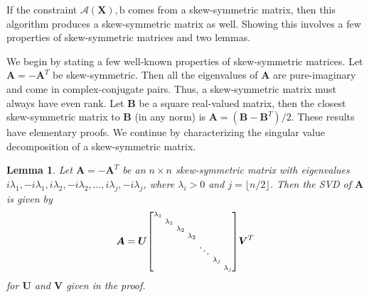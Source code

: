 \documentclass{sig-alternate}
\newtheorem{lemma}[theorem]{Lemma}
\newcommand{\sA}{\mathcal{A}}
\newenvironment{sbmatrix}{\left[\!\begin{smallmatrix}}
{\end{smallmatrix}\!\right]}
\newcommand{\mat}{\boldsymbol}
\renewcommand{\vec}[1]{\boldsymbol{\mathrm{#1}}}
\providecommand{\mA}{\ensuremath{\mat{A}}}
\providecommand{\mB}{\ensuremath{\mat{B}}}
\providecommand{\mU}{\ensuremath{\mat{U}}}
\providecommand{\mV}{\ensuremath{\mat{V}}}
\providecommand{\mX}{\ensuremath{\mat{X}}}
\providecommand{\vb}{\ensuremath{\vec{b}}}
\begin{document}
If the constraint $\sA(\mX), \vb$
comes from a skew-symmetric matrix,
then this algorithm produces a skew-symmetric
matrix as well.  Showing this involves
a few properties of skew-symmetric matrices and two lemmas.

We begin by stating a few well-known properties of skew-symmetric
matrices. Let $\mA=-\mA^T$ be skew-symmetric.
Then all the eigenvalues of 
$\mA$ are pure-imaginary and come in complex-conjugate pairs. 
Thus, a skew-symmetric matrix must always have even rank.
Let $\mB$ be a square real-valued matrix, then the closest
skew-symmetric matrix to $\mB$ (in any norm) is 
$\mA = (\mB - \mB^T)/2$.  These results have
elementary proofs.  We continue by characterizing the
singular value decomposition of a skew-symmetric matrix.

\begin{lemma} \label{lem:sssvd}
Let $\mA = -\mA^T$ be an $n \times n$ skew-symmetric matrix
with eigenvalues $i \lambda_1, -i \lambda_1, i \lambda_2, -i \lambda_2, \ldots, 
i \lambda_j, -i\lambda_j$, where $\lambda_i > 0$ and $j = \lfloor n/2 \rfloor$.  
Then the SVD of $\mA$ is given by 
\begin{equation}
  \mA = \mU 
    \begin{sbmatrix} \lambda_1 \\ 
                    & \lambda_1 \\
                    & & \lambda_2 \\
                    & & & \lambda_2 \\
                    & & & & \ddots \\
                    & & & & & \lambda_j \\
                    & & & & & & \lambda_j 
    \end{sbmatrix} \mV^T
\end{equation}
for $\mU$ and $\mV$ given in the proof.
\end{lemma}
\end{document}
